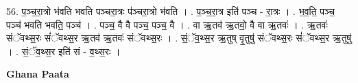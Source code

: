 \documentclass[17pt]{extarticle}
\begin{document}
56. प॒ञ्च॒रा॒त्रो भ॑वति भवति पञ्चरा॒त्रः प॑ञ्चरा॒त्रो भ॑वति । . प॒ञ्च॒रा॒त्र इति॑ पञ्च - रा॒त्रः । . भ॒व॒ति॒ पञ्च॒ पञ्च॑ भवति भवति॒ पञ्च॑ । . पञ्च॒ वै वै पञ्च॒ पञ्च॒ वै । . वा ऋ॒तव॑ ऋ॒तवो॒ वै वा ऋ॒तवः॑ । . ऋ॒तवः॑ संॅवथ्स॒रः सं॑ॅवथ्स॒र ऋ॒तव॑ ऋ॒तवः॑ संॅवथ्स॒रः । . सं॒ॅव॒थ्स॒र ऋ॒तुष् वृ॒तुषु॑ संॅवथ्स॒रः सं॑ॅवथ्स॒र ऋ॒तुषु॑ । . सं॒ॅव॒थ्स॒र इति॑ सं - व॒थ्स॒रः । \newline

\textbf{Ghana Paata } \newline
\end{document}
